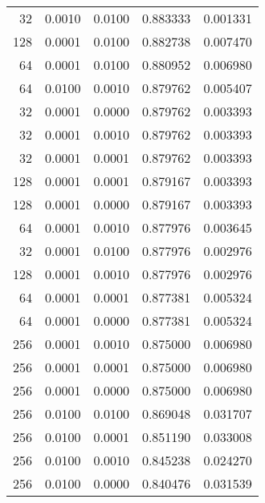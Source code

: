 \begin{tabular}{rrrrr}
  32 &  0.0010 &  0.0100 &  0.883333 &  0.001331 \\
 128 &  0.0001 &  0.0100 &  0.882738 &  0.007470 \\
  64 &  0.0001 &  0.0100 &  0.880952 &  0.006980 \\
  64 &  0.0100 &  0.0010 &  0.879762 &  0.005407 \\
  32 &  0.0001 &  0.0000 &  0.879762 &  0.003393 \\
  32 &  0.0001 &  0.0010 &  0.879762 &  0.003393 \\
  32 &  0.0001 &  0.0001 &  0.879762 &  0.003393 \\
 128 &  0.0001 &  0.0001 &  0.879167 &  0.003393 \\
 128 &  0.0001 &  0.0000 &  0.879167 &  0.003393 \\
  64 &  0.0001 &  0.0010 &  0.877976 &  0.003645 \\
  32 &  0.0001 &  0.0100 &  0.877976 &  0.002976 \\
 128 &  0.0001 &  0.0010 &  0.877976 &  0.002976 \\
  64 &  0.0001 &  0.0001 &  0.877381 &  0.005324 \\
  64 &  0.0001 &  0.0000 &  0.877381 &  0.005324 \\
 256 &  0.0001 &  0.0010 &  0.875000 &  0.006980 \\
 256 &  0.0001 &  0.0001 &  0.875000 &  0.006980 \\
 256 &  0.0001 &  0.0000 &  0.875000 &  0.006980 \\
 256 &  0.0100 &  0.0100 &  0.869048 &  0.031707 \\
 256 &  0.0100 &  0.0001 &  0.851190 &  0.033008 \\
 256 &  0.0100 &  0.0010 &  0.845238 &  0.024270 \\
 256 &  0.0100 &  0.0000 &  0.840476 &  0.031539 \\
\bottomrule
\end{tabular}
